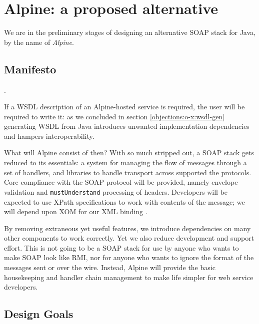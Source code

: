 \section{Alpine: a proposed alternative}
\label{alpine}

We are in the preliminary stages of designing an alternative SOAP
stack for Java, by the name of \emph{Alpine}.

\subsection{Manifesto}
\label{alpine:manifesto}

.

If a WSDL description of an Alpine-hosted service is required, the
user will be required to write it: as we concluded in section
\ref{objections:o-x:wsdl-gen} generating WSDL from Java introduces
unwanted implementation dependencies and hampers interoperability.

What will Alpine consist of then? With so much stripped out, a SOAP
stack gets reduced to its essentials: a system for managing the flow
of messages through a set of handlers, and libraries to handle
transport across supported the protocols. Core compliance with the
SOAP protocol will be provided, namely envelope validation and
\verb|mustUnderstand| processing of headers. Developers will be
expected to use XPath specifications to work with contents of the
message; we will depend upon XOM for our XML binding
\cite{harold:xom}.

By removing extraneous yet useful features, we introduce dependencies
on many other components to work correctly. Yet we also reduce
development and support effort. This is not going to be a SOAP stack
for use by anyone who wants to make SOAP look like RMI, nor for anyone
who wants to ignore the format of the messages sent or over the wire.
Instead, Alpine will provide the basic housekeeping and handler
chain management to make life simpler for web service developers.

\subsection{Design Goals}
\label{alpine:design}

